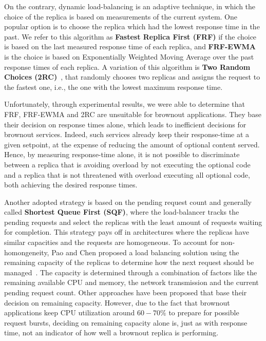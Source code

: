 On the contrary, dynamic load-balancing is an adaptive technique, in
which the choice of the replica is based on measurements of the
current system.  One popular option is to choose the replica which had
the lowest response time in the past.  We refer to this algorithm as
\textbf{Fastest Replica First (FRF)} if the choice is based on the
last measured response time of each replica, and \textbf{FRF-EWMA} is
the choice is based on Exponentially Weighted Moving Average over the
past response times of each replica.  A variation of this algorithm is
\textbf{Two Random Choices (2RC)}~\cite{2RC}, that randomly chooses
two replicas and assigns the request to the fastest one, i.e., the one
with the lowest maximum response time.

Unfortunately, through experimental results, we were able to determine
that FRF, FRF-EWMA and 2RC are unsuitable for brownout
applications. They base their decision on response times alone, which
leads to inefficient decisions for brownout services. Indeed, such
services already keep their response-time at a given setpoint, at the
expense of reducing the amount of optional content served. Hence, by
measuring response-time alone, it is not possible to discriminate
between a replica that is avoiding overload by not executing the
optional code and a replica that is not threatened with overload
executing all optional code, both achieving the desired response times.

Another adopted strategy is based on the pending request count and
generally called \textbf{Shortest Queue First (SQF)}, where the
load-balancer tracks the pending requests and select the replicas with the
least amount of requests waiting for completion. This strategy pays off in architectures
where the replicas have similar capacities and the requests are
homogeneous. To account for non-homongeneity, Pao and Chen proposed a
load balancing solution using the remaining capacity of the replicas
to determine how the next request should be
managed~\cite{feedbackintensive}. The capacity is determined through a
combination of factors like the remaining available CPU and memory,
the network transmission and the current pending request count.  Other
approaches have been proposed that base their decision on remaining
capacity. However, due to the fact that brownout applications keep CPU
utilization around $60-70\%$ to prepare for possible request bursts,
deciding on remaining capacity alone is, just as with response time,
not an indicator of how well a brownout replica is performing.


